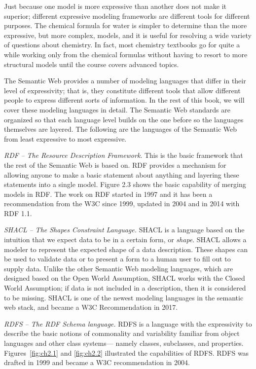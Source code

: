 Just because one model is more expressive than another does not make it
superior; different expressive modeling frameworks are different tools
for different purposes. The chemical formula for water is simpler to
determine than the more expressive, but more complex, models, and it is
useful for resolving a wide variety of questions about chemistry. In
fact, most chemistry textbooks go for quite a while working only from
the chemical formulas without having to resort to more structural models
until the course covers advanced topics.

The Semantic Web provides a number of modeling languages that differ in
their level of expressivity; that is, they constitute different tools
that allow different people to express different sorts of information.
In the rest of this book, we will cover these modeling languages in
detail. The Semantic Web standards are organized so that each language
level builds on the one before so the languages themselves are layered.
The following are the languages of the Semantic Web from least
expressive to most expressive.

\emph{RDF} \emph{--} \emph{The Resource Description Framework}. This is
the basic framework that the rest of the Semantic Web is based on. RDF
provides a mechanism for allowing anyone to make a basic statement about
anything and layering these statements into a single model. Figure 2.3
shows the basic capability of merging models in RDF. The work on RDF
started in 1997 and it has been a recommendation from the W3C since
1999, updated in 2004 and in 2014 with RDF 1.1.

\emph{SHACL} \emph{-- The Shapes Constraint Language.} SHACL is a language
based on the intuition that we expect data to be in a certain form, or \emph{shape}.
SHACL allows a modeler to represent the expected shape of a data description. These shapes can be
used to validate data or to present a form to a human user to fill out to supply data.
Unlike the other Semantic Web modeling languages, which are designed based on the Open World Assumption, SHACL works with the Closed World Assumption; if data is not included in   a description, then it is considered to be missing. 
SHACL is one of the newest modeling languages in the semantic web stack, and became a
W3C Recommendation in 2017. 

\emph{RDFS} \emph{-- The RDF Schema language.} RDFS is a language with
the expressivity to describe the basic notions of commonality and
variability familiar from object languages and other class systems---
namely classes, subclasses, and properties. Figures~\ref{fig:ch2.1} and \ref{fig:ch2.2}
illustrated the capabilities of RDFS. RDFS was drafted in 1999 and
became a W3C recommendation in 2004.

